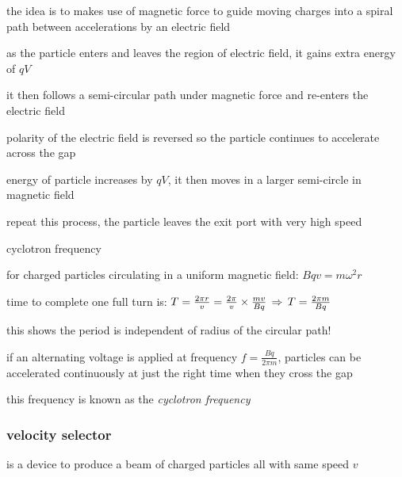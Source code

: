 the idea is to makes use of magnetic force to guide moving charges into a spiral path between accelerations by an electric field

as the particle enters and leaves the region of electric field, it gains extra energy of $qV$

it then follows a semi-circular path under magnetic force and re-enters the electric field

polarity of the electric field is reversed so the particle continues to accelerate across the gap

energy of particle increases by $qV$, it then moves in a larger semi-circle in magnetic field

repeat this process, the particle leaves the exit port with very high speed



\cmt cyclotron frequency

for charged particles circulating in a uniform magnetic field: $Bqv=m\omega^2 r$

time to complete one full turn is: $T=\frac{2\pi r}{v} = \frac{2\pi}{v}\times\frac{mv}{Bq}\, \Rightarrow \, T=\frac{2\pi m}{Bq}$

this shows the period is independent of radius of the circular path!

if an alternating voltage is applied at frequency $f=\frac{Bq}{2\pi m}$, particles can be accelerated continuously at just the right time when they cross the gap

this frequency is known as the \emph{cyclotron frequency}



\subsubsection{velocity selector}

 is a device to produce a beam of charged particles all with same speed $v$

